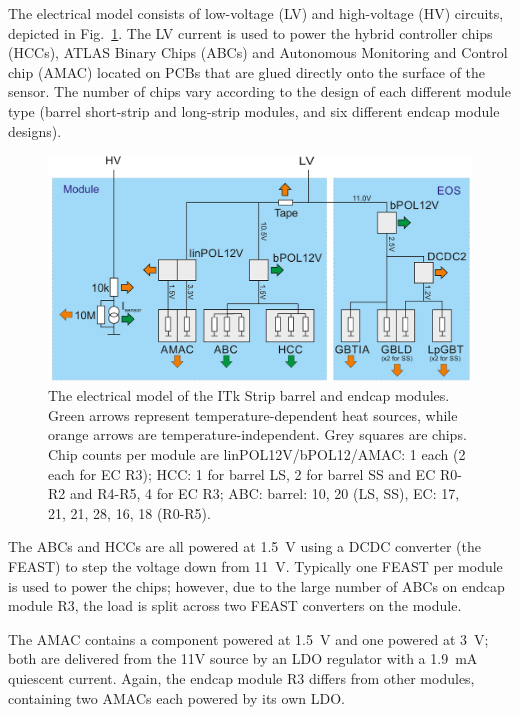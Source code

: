 
The electrical model consists of low-voltage (LV) and high-voltage (HV) circuits, depicted in
Fig.~\ref{electrical_model}. The LV current is used to power the hybrid controller chips (HCCs),
ATLAS Binary Chips (ABCs) and Autonomous Monitoring and Control chip (AMAC) located on PCBs that are
glued directly onto the surface of the sensor. The number of chips vary according to the design of
each different module type (barrel short-strip and long-strip modules, and six different endcap
module designs).

\begin{figure}[ht!]
\centering
\includegraphics[width=0.8\linewidth]{figures/electrical_model.pdf}
\caption{
The electrical model of the ITk Strip barrel and endcap modules. Green arrows represent temperature-dependent heat sources, while orange arrows are temperature-independent. Grey squares are chips. Chip counts per module are linPOL12V/bPOL12/AMAC: 1 each (2 each for EC R3); HCC: 1 for barrel LS, 2 for barrel SS and EC R0-R2 and R4-R5, 4 for EC R3; ABC: barrel: 10, 20 (LS, SS), EC: 17, 21, 21, 28, 16, 18 (R0-R5).
}
\label{electrical_model}
\end{figure}

The ABCs and HCCs are all powered at 1.5~V using a DCDC converter (the FEAST) to step the voltage down
from 11~V. Typically one FEAST per module is used to power the chips; however, due to the large
number of ABCs on endcap module R3, the load is split across two FEAST converters on the module.

The AMAC contains a component powered at 1.5~V and one powered at 3~V; both are delivered from the
11V source by an LDO regulator with a 1.9~mA quiescent current.
Again, the endcap module R3 differs from other modules, containing two AMACs each powered by its own
LDO.

